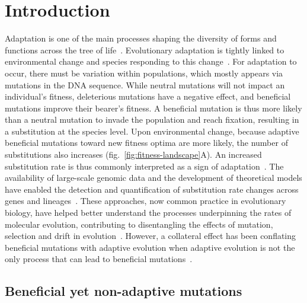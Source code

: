 \documentclass{article}
\begin{document}
    \section*{Introduction}
    Adaptation is one of the main processes shaping the diversity of forms and functions across the tree of life~\cite{darwin_origin_1859}.
    Evolutionary adaptation is tightly linked to environmental change and species responding to this change~\cite{merrell_adaptive_1994, gavrilets_adaptive_2009}.
    For adaptation to occur, there must be variation within populations, which mostly appears via mutations in the DNA sequence.
    While neutral mutations will not impact an individual's fitness, deleterious mutations have a negative effect, and beneficial mutations improve their bearer's fitness.
    A beneficial mutation is thus more likely than a neutral mutation to invade the population and reach fixation, resulting in a substitution at the species level.
    Upon environmental change, because adaptive beneficial mutations toward new fitness optima are more likely, the number of substitutions also increases (fig.~\ref{fig:fitness-landscape}A).
    An increased substitution rate is thus commonly interpreted as a sign of adaptation~\cite{mcdonald_adaptative_1991, smith_adaptive_2002, welch_estimating_2006}.
    The availability of large-scale genomic data and the development of theoretical models have enabled the detection and quantification of substitution rate changes across genes and lineages~\cite{yang_statistical_2000, eyre-walker_genomic_2006, moutinho_variation_2019}.
    These approaches, now common practice in evolutionary biology, have helped better understand the processes underpinning the rates of molecular evolution, contributing to disentangling the effects of mutation, selection and drift in evolution~\cite{lynch_mutation_2023}.
    However, a collateral effect has been conflating beneficial mutations with adaptive evolution when adaptive evolution is not the only process that can lead to beneficial mutations~\cite{charlesworth_other_2007, mustonen_fitness_2009, jones_shifting_2017}.

    \subsection*{Beneficial yet non-adaptive mutations}
\end{document}
